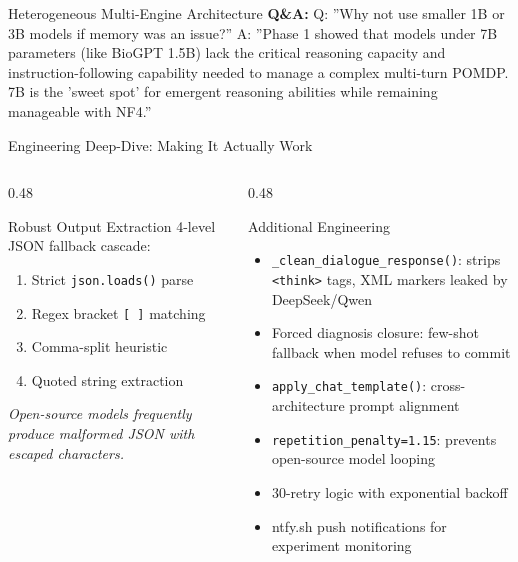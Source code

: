 \begin{frame}{Heterogeneous Multi-Engine Architecture}
{\textbf{Q\&A:}
Q: ''Why not use smaller 1B or 3B models if memory was an issue?''
A: ''Phase 1 showed that models under 7B parameters (like BioGPT 1.5B) lack the critical reasoning capacity and instruction-following capability needed to manage a complex multi-turn POMDP. 7B is the 'sweet spot' for emergent reasoning abilities while remaining manageable with NF4.''
}
\end{frame}

\begin{frame}{Engineering Deep-Dive: Making It Actually Work}
\begin{columns}[T]
\begin{column}{0.48\textwidth}
\begin{block}{\small Robust Output Extraction}
\footnotesize
4-level JSON fallback cascade:
\begin{enumerate}
  \item Strict \texttt{json.loads()} parse
  \item Regex bracket \texttt{[\,]} matching
  \item Comma-split heuristic
  \item Quoted string extraction
\end{enumerate}
\vspace{0.3em}
\textit{Open-source models frequently produce malformed JSON with escaped characters.}
\end{block}
\end{column}
\begin{column}{0.48\textwidth}
\begin{block}{\small Additional Engineering}
\footnotesize
\begin{itemize}
  \item \texttt{\_clean\_dialogue\_response()}: strips \texttt{<think>} tags, XML markers leaked by DeepSeek/Qwen
  \item Forced diagnosis closure: few-shot fallback when model refuses to commit
  \item \texttt{apply\_chat\_template()}: cross-architecture prompt alignment
  \item \texttt{repetition\_penalty=1.15}: prevents open-source model looping
  \item 30-retry logic with exponential backoff
  \item ntfy.sh push notifications for experiment monitoring
\end{itemize}
\end{block}
\end{column}
\end{columns}


\end{frame}
